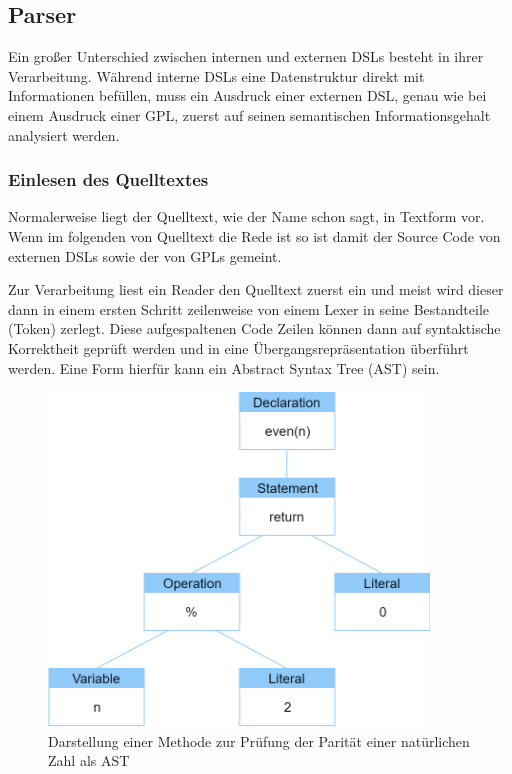 \documentclass[12pt,oneside,a4paper,parskip]{scrbook}
\begin{document}
\subsection{Parser}

Ein großer Unterschied zwischen internen und externen DSLs besteht in ihrer Verarbeitung. Während interne DSLs eine Datenstruktur direkt mit Informationen befüllen, muss ein Ausdruck einer externen DSL, genau wie bei einem Ausdruck einer GPL, zuerst auf seinen semantischen Informationsgehalt analysiert werden.

\subsubsection{Einlesen des Quelltextes}

Normalerweise liegt der Quelltext, wie der Name schon sagt, in Textform vor. Wenn im folgenden von Quelltext die Rede ist so ist damit der Source Code von externen DSLs sowie der von GPLs gemeint. 

Zur Verarbeitung liest ein Reader den Quelltext zuerst ein und meist wird dieser dann in einem ersten Schritt zeilenweise von einem Lexer in seine Bestandteile (Token) zerlegt. Diese aufgespaltenen Code Zeilen können dann auf syntaktische Korrektheit geprüft werden und in eine Übergangsrepräsentation überführt werden\cite[S. 29f.]{parr2009}. Eine Form hierfür kann ein Abstract Syntax Tree (AST) sein.

\begin{figure}[htbp]
	\centering
	\includegraphics[width=0.9\textwidth]{bilder/ast}
	\caption{Darstellung einer Methode zur Prüfung der Parität einer natürlichen Zahl als AST}
	\label{fig:ast}
\end{figure}
\end{document}

